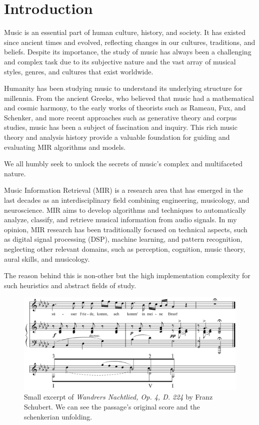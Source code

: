 \chapter{Introduction}

Music is an essential part of human culture, history, and society. It has existed since ancient times and evolved, reflecting changes in our cultures, traditions, and beliefs. Despite its importance, the study of music has always been a challenging and complex task due to its subjective nature and the vast array of musical styles, genres, and cultures that exist worldwide.

Humanity has been studying music to understand its underlying structure for millennia. From the ancient Greeks, who believed that music had a mathematical and cosmic harmony, to the early works of theorists such as Rameau, Fux, and Schenker, and more recent approaches such as generative theory and corpus studies, music has been a subject of fascination and inquiry. This rich music theory and analysis history provide a valuable foundation for guiding and evaluating MIR algorithms and models. 

We all humbly seek to unlock the secrets of music's complex and multifaceted nature.

Music Information Retrieval (MIR) is a research area that has emerged in the last decades as an interdisciplinary field combining engineering, musicology, and neuroscience. MIR aims to develop algorithms and techniques to automatically analyze, classify, and retrieve musical information from audio signals. In my opinion, MIR research has been traditionally focused on technical aspects, such as digital signal processing (DSP), machine learning, and pattern recognition, neglecting other relevant domains, such as perception, cognition, music theory, aural skills, and musicology.

The reason behind this is non-other but the high implementation complexity for such heuristics and abstract fields of study.


\begin{figure}[!ht]
\includegraphics[clip,width=\columnwidth]{figures/schenkerian analysis/SchubertOp4no3.png}%
\caption{Small excerpt of \textit{Wandrers Nachtlied, Op. 4, D. 224} by Franz Schubert. We can see the passage's original score and the schenkerian unfolding.}
\label{fig:timeseries}
\end{figure}

